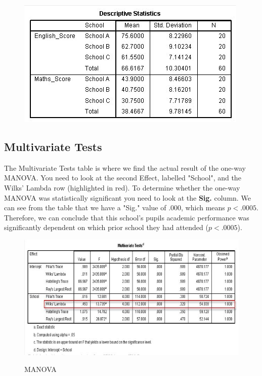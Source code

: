 \documentclass[a4paper,12pt]{article}
\begin{document}
\begin{figure}
\centering
\includegraphics[width=0.7\linewidth]{images/MANOVA8}
\caption{}
\label{fig:MANOVA8}
\end{figure}



\subsection{Multivariate Tests}
The Multivariate Tests table is where we find the actual result of the one-way MANOVA. You need to look at the second Effect, labelled "School", and the Wilks' Lambda row (highlighted in red). To determine whether the one-way MANOVA was statistically significant you need to look at the \textbf{Sig.} column. We can see from the table that we have a "Sig." value of .000, which means $p < .0005$. Therefore, we can conclude that this school's pupils academic performance was significantly dependent on which prior school they had attended ($p < .0005$).


\begin{center}
\begin{figure}[h!]
  \includegraphics[scale=0.6]{images/MANOVA7}\\
  \caption{MANOVA}
\end{figure}
\end{center}
\end{document}
